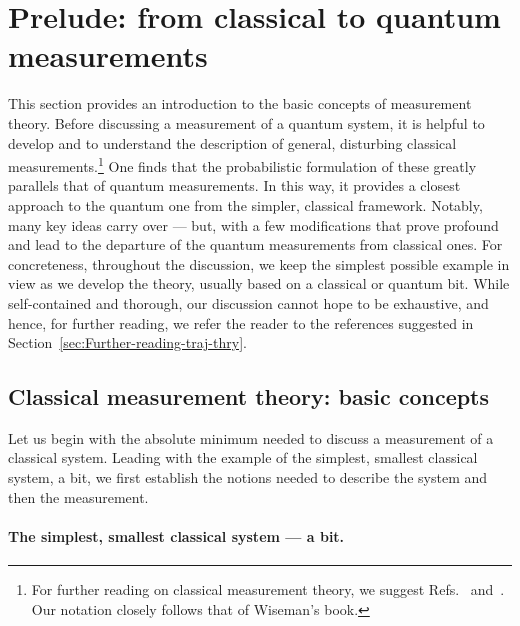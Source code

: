 \section{Prelude: from classical to quantum measurements\label{sec:Primer:-classical-vs.}}

This section provides an introduction to the basic concepts of measurement
theory. Before discussing a measurement of a quantum system, it is
helpful to develop and to understand the description of general, disturbing
classical measurements.\footnote{For further reading on classical measurement theory, we suggest Refs.~\citet{wiseman2010book}
and~\citet{jacobs2014book}. Our notation closely follows that of
Wiseman's book.} One finds that the probabilistic formulation of these greatly parallels
that of quantum measurements. In this way, it provides a closest approach
to the quantum one from the simpler, classical framework. Notably,
many key ideas carry over — but, with a few modifications that prove
profound and lead to the departure of the quantum measurements from
classical ones. For concreteness, throughout the discussion, we keep
the simplest possible example in view as we develop the theory, usually
based on a classical or quantum bit. While self-contained and thorough,
our discussion cannot hope to be exhaustive, and hence, for further
reading, we refer the reader to the references suggested in Section~\ref{sec:Further-reading-traj-thry}.

\subsection{Classical measurement theory: basic concepts\label{subsec:Classical-measurement-theory-basic-concept}}

Let us begin with the absolute minimum needed to discuss a measurement
of a classical system. Leading with the example of the simplest, smallest
classical system, a bit, we first establish the notions needed to
describe the system and then the measurement.

\paragraph{The simplest, smallest classical system — a bit.}

